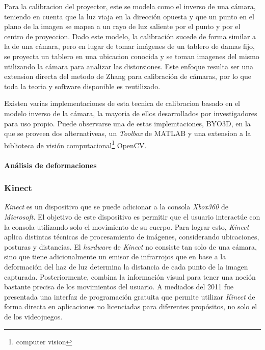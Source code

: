 Para la calibracion del proyector, este se modela como el inverso de una cámara, teniendo en cuenta que la luz viaja en la dirección opuesta y que un punto en el plano de la imagen se mapea a un rayo de luz saliente por el punto y por el centro de proyeccion. Dado este modelo, la calibración sucede de forma similar a la de una cámara, pero en lugar de tomar imágenes de un tablero de damas fijo, se proyecta un tablero en una ubicacion conocida y se toman imagenes del mismo utilizando la cámara para analizar las distorsiones. Este enfoque resulta ser una extension directa del metodo de Zhang para calibración de cámaras, por lo que toda la teoria y software disponible es reutilizado.  

Existen varias implementaciones de esta tecnica de calibracion basado en el modelo inverso de la cámara, la mayoria de ellos desarrollados por investigadores para uso propio. Puede observarse una de estas implemtaciones, BYO3D\cite{BYO3D}, en la que se proveen dos alternativeas, un \emph{Toolbox} de MATLAB\cite{MATLAB} y una extension a la biblioteca de visión computacional\footnote{computer vision} OpenCV\cite{OpenCV}.

\paragraph{Análisis de deformaciones}

\subsubsection{Kinect}

\emph{Kinect} es un dispositivo que se puede adicionar a la consola \emph{Xbox360} de \emph{Microsoft}. El objetivo de este dispositivo es permitir que el usuario interactúe con la consola utilizando solo el movimiento de su cuerpo. Para lograr esto, \emph{Kinect} aplica distintas técnicas de procesamiento de imágenes, considerando ubicaciones, posturas y distancias. El \emph{hardware} de \emph{Kinect} no consiste tan solo de una cámara, sino que tiene adicionalmente un emisor de infrarrojos que en base a la deformación del haz de luz determina la distancia de cada punto de la imagen capturada. Posteriormente, combina la información visual para tener una noción bastante precisa de los movimientos del usuario. A mediados del 2011 fue presentada una interfaz de programación gratuita que permite utilizar \emph{Kinect} de forma directa en aplicaciones no licenciadas para diferentes propósitos, no solo el de los videojuegos.

